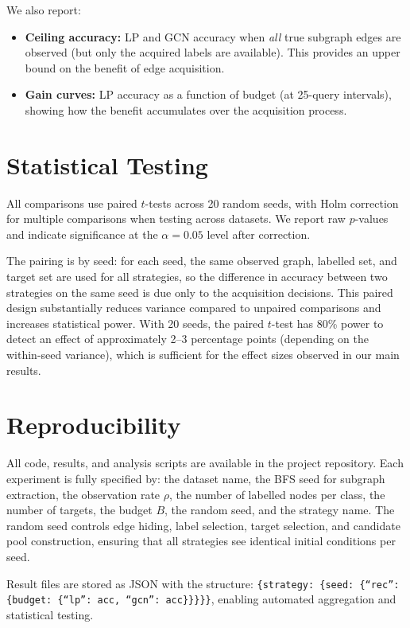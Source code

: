 \documentclass[12pt,a4paper,oneside]{report}
\begin{document}
We also report:
\begin{itemize}[leftmargin=2em]
    \item \textbf{Ceiling accuracy:} LP and GCN accuracy when \emph{all} true subgraph edges are observed (but only the acquired labels are available). This provides an upper bound on the benefit of edge acquisition.
    \item \textbf{Gain curves:} LP accuracy as a function of budget (at 25-query intervals), showing how the benefit accumulates over the acquisition process.
\end{itemize}

\section{Statistical Testing}

All comparisons use paired $t$-tests across 20 random seeds, with Holm correction for multiple comparisons when testing across datasets. We report raw $p$-values and indicate significance at the $\alpha = 0.05$ level after correction.

The pairing is by seed: for each seed, the same observed graph, labelled set, and target set are used for all strategies, so the difference in accuracy between two strategies on the same seed is due only to the acquisition decisions. This paired design substantially reduces variance compared to unpaired comparisons and increases statistical power. With 20 seeds, the paired $t$-test has 80\% power to detect an effect of approximately 2--3 percentage points (depending on the within-seed variance), which is sufficient for the effect sizes observed in our main results.

\section{Reproducibility}

All code, results, and analysis scripts are available in the project repository. Each experiment is fully specified by: the dataset name, the BFS seed for subgraph extraction, the observation rate $\rho$, the number of labelled nodes per class, the number of targets, the budget $B$, the random seed, and the strategy name. The random seed controls edge hiding, label selection, target selection, and candidate pool construction, ensuring that all strategies see identical initial conditions per seed.

Result files are stored as JSON with the structure: \texttt{\{strategy: \{seed: \{``rec'': \{budget: \{``lp'': acc, ``gcn'': acc\}\}\}\}\}}, enabling automated aggregation and statistical testing.
\end{document}
